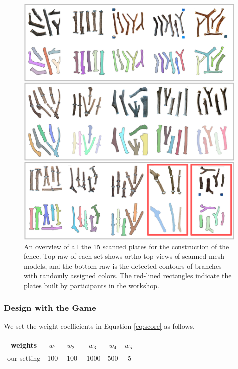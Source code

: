 \begin{figure}[ht]
  \begin{center}
    \includegraphics[width = 0.4\paperwidth]{images/fabrication/all_plates.png}
    \caption{An overview of all the 15 scanned plates for the construction of the fence. Top raw of each set shows ortho-top views of scanned mesh models, and the bottom raw is the detected contours of branches with randomly assigned colors. The red-lined rectangles indicate the plates built by participants in the workshop.}
    \label{fig:scannedplates}
  \end{center}
\end{figure}


\subsubsection*{Design with the Game}

We set the weight coefficients in Equation \ref{eq:score} as follows.
\begin{center}
	\begin{tabulary}{\columnwidth}{ |C||C|C|C|C|C| }
		\hline
		weights & $w_1$ & $w_2$ & $w_3$ & $w_4$ & $w_5$ \\
		\hline
		our setting & 100 & -100 & -1000 & 500 & -5 \\
		\hline
	\end{tabulary}
	\label{tab:weights}
\end{center}

